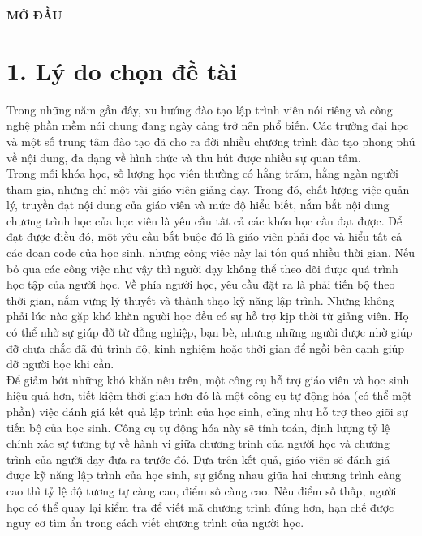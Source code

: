 \newpage

\begin{center}
	\textbf{MỞ ĐẦU}
\end{center}


\section*{1. Lý do chọn đề tài}

Trong những năm gần đây, xu hướng đào tạo lập trình viên nói riêng và công nghệ phần mềm nói chung đang ngày càng trở nên phổ biến. Các trường đại học và một số trung tâm đào tạo đã cho ra đời nhiều chương trình đào tạo phong phú về nội dung, đa dạng về hình thức và thu hút được nhiều sự quan tâm.\\

Trong mỗi khóa học, số lượng học viên thường có hằng trăm, hằng ngàn người tham gia, nhưng chỉ một vài giáo viên giảng dạy. Trong đó, chất lượng việc quản lý, truyền đạt nội dung của giáo viên và mức độ hiểu biết, nắm bắt nội dung chương trình học của học viên là yêu cầu tất cả các khóa học cần đạt được. Để đạt được điều đó, một yêu cầu bắt buộc đó là giáo viên phải đọc và hiểu tất cả các đoạn code của học sinh, nhưng công việc này lại tốn quá nhiều thời gian. Nếu bỏ qua các công việc như vậy thì người dạy không thể theo dõi được quá trình học tập của người học. Về phía người học, yêu cầu đặt ra là phải tiến bộ theo thời gian, nắm vững lý thuyết và thành thạo kỹ năng lập trình. Những không phải lúc nào gặp khó khăn người học đều có sự hỗ trợ kịp thời từ giảng viên. Họ có thể nhờ sự giúp đỡ từ đồng nghiệp, bạn bè, nhưng những người được nhờ giúp đỡ chưa chắc đã đủ trình độ, kinh nghiệm hoặc thời gian để ngồi bên cạnh giúp đỡ người học khi cần.\\

Để giảm bớt những khó khăn nêu trên, một công cụ hỗ trợ giáo viên và học sinh hiệu quả hơn, tiết kiệm thời gian hơn đó là một công cụ tự động hóa (có thể một phần) việc đánh giá kết quả lập trình của học sinh, cũng như hỗ trợ theo giõi sự tiến bộ của học sinh. Công cụ tự động hóa này sẽ tính toán, định lượng tỷ lệ chính xác sự tương tự về hành vi giữa chương trình của người học và chương trình của người dạy đưa ra trước đó. Dựa trên kết quả, giáo viên sẽ đánh giá được kỹ năng lập trình của học sinh, sự giống nhau giữa hai chương trình càng cao thì tỷ lệ độ tương tự càng cao, điểm số càng cao. Nếu điểm số thấp, người học có thể quay lại kiểm tra để viết mã chương trình đúng hơn, hạn chế được nguy cơ tìm ẩn trong cách viết chương trình của người học.\\

